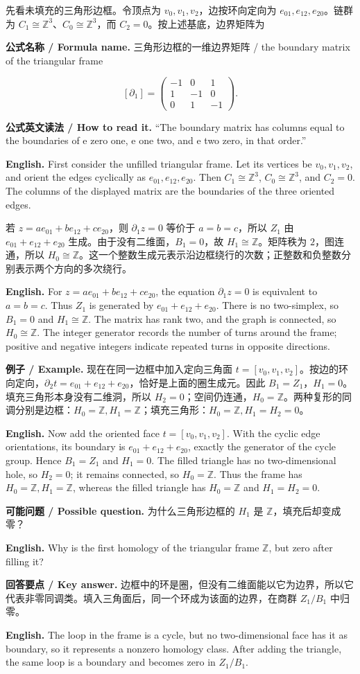 \documentclass[UTF8,11pt,a4paper]{ctexart}
\newcommand{\EN}[1]{\par\noindent\textbf{English.} #1\par}
\newcommand{\READ}[1]{\par\noindent\textbf{公式英文读法 / How to read it.} #1\par}
\newcommand{\FORMULA}[2]{\par\noindent\textbf{公式名称 / Formula name.} #1 / #2\par}
\newcommand{\EX}[2]{\par\noindent\textbf{例子 / Example.} #1\par\EN{#2}}
\newcommand{\ASK}[4]{\par\noindent\textbf{可能问题 / Possible question.} #1\par\EN{#2}\noindent\textbf{回答要点 / Key answer.} #3\par\EN{#4}\medskip}
\begin{document}
\noindent 先看未填充的三角形边框。令顶点为 $v_0,v_1,v_2$，边按环向定向为 $e_{01},e_{12},e_{20}$。链群为 $C_1\cong\mathbb Z^3$、$C_0\cong\mathbb Z^3$，而 $C_2=0$。按上述基底，边界矩阵为
\FORMULA{三角形边框的一维边界矩阵}{the boundary matrix of the triangular frame}
\[
[\partial_1]=
\begin{pmatrix}
-1&0&1\\
1&-1&0\\
0&1&-1
\end{pmatrix}.
\]
\READ{“The boundary matrix has columns equal to the boundaries of e zero one, e one two, and e two zero, in that order.”}
\EN{First consider the unfilled triangular frame. Let its vertices be $v_0,v_1,v_2$, and orient the edges cyclically as $e_{01},e_{12},e_{20}$. Then $C_1\cong\mathbb Z^3$, $C_0\cong\mathbb Z^3$, and $C_2=0$. The columns of the displayed matrix are the boundaries of the three oriented edges.}
\noindent 若 $z=ae_{01}+be_{12}+ce_{20}$，则 $\partial_1z=0$ 等价于 $a=b=c$，所以 $Z_1$ 由 $e_{01}+e_{12}+e_{20}$ 生成。由于没有二维面，$B_1=0$，故 $H_1\cong\mathbb Z$。矩阵秩为 $2$，图连通，所以 $H_0\cong\mathbb Z$。这一个整数生成元表示沿边框绕行的次数；正整数和负整数分别表示两个方向的多次绕行。
\EN{For $z=ae_{01}+be_{12}+ce_{20}$, the equation $\partial_1z=0$ is equivalent to $a=b=c$. Thus $Z_1$ is generated by $e_{01}+e_{12}+e_{20}$. There is no two-simplex, so $B_1=0$ and $H_1\cong\mathbb Z$. The matrix has rank two, and the graph is connected, so $H_0\cong\mathbb Z$. The integer generator records the number of turns around the frame; positive and negative integers indicate repeated turns in opposite directions.}
\EX{现在在同一边框中加入定向三角面 $t=[v_0,v_1,v_2]$。按边的环向定向，$\partial_2t=e_{01}+e_{12}+e_{20}$，恰好是上面的圈生成元。因此 $B_1=Z_1$，$H_1=0$。填充三角形本身没有二维洞，所以 $H_2=0$；空间仍连通，$H_0=\mathbb Z$。两种复形的同调分别是边框：$H_0=\mathbb Z,H_1=\mathbb Z$；填充三角形：$H_0=\mathbb Z,H_1=H_2=0$。}{Now add the oriented face $t=[v_0,v_1,v_2]$. With the cyclic edge orientations, its boundary is $e_{01}+e_{12}+e_{20}$, exactly the generator of the cycle group. Hence $B_1=Z_1$ and $H_1=0$. The filled triangle has no two-dimensional hole, so $H_2=0$; it remains connected, so $H_0=\mathbb Z$. Thus the frame has $H_0=\mathbb Z,H_1=\mathbb Z$, whereas the filled triangle has $H_0=\mathbb Z$ and $H_1=H_2=0$.}
\ASK{为什么三角形边框的 $H_1$ 是 $\mathbb Z$，填充后却变成零？}{Why is the first homology of the triangular frame $\mathbb Z$, but zero after filling it?}{边框中的环是圈，但没有二维面能以它为边界，所以它代表非零同调类。填入三角面后，同一个环成为该面的边界，在商群 $Z_1/B_1$ 中归零。}{The loop in the frame is a cycle, but no two-dimensional face has it as boundary, so it represents a nonzero homology class. After adding the triangle, the same loop is a boundary and becomes zero in $Z_1/B_1$.}
\end{document}
